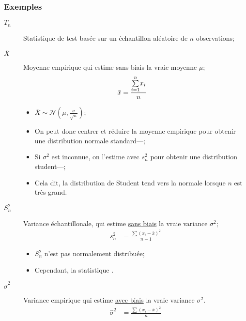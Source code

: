 \documentclass[10pt, french]{article}
\begin{document}
\begin{multicols*}{2}
\subsubsection*{Exemples}
\begin{distributions}[Notation]
\begin{description}
	\item[$T_{n}$]	Statistique de test basée sur un échantillon aléatoire de $n$ observations;
	\item[$\bar{X}$]	Moyenne empirique qui estime sans biais la vraie moyenne $\mu$;
		\begin{align*}
		\bar{x}
		&=	\frac{\overset{n}{\underset{i = 1}{\sum}} x_{i}}{n}
		\end{align*}
		\begin{itemize}
		\item	$\bar{X}	\sim \mathcal{N}(\mu, \frac{\sigma}{\sqrt{n}})$;
		\item	On peut donc centrer et réduire la moyenne empirique pour obtenir une distribution normale standard---;
		\item	Si $\sigma^{2}$ est inconnue, on l'estime avec $s^{2}_{n}$ pour obtenir une distribution student---;
		\item	Cela dit, la distribution de Student tend vers la normale lorsque $n$ est très grand.
		\end{itemize}
	\item[$S_{n}^{2}$]	Variance échantillonale, qui estime \underline{sans biais} la vraie variance $\sigma^{2}$;
		\begin{align*}
			s^{2}_{n}
			&=	\frac{\sum (x_{i} - \bar{x})^{2}}{n - 1}
		\end{align*}
		\begin{itemize}
		\item	$S^{2}_{n}$ n'est pas normalement distribuée; 
		\item	Cependant, la statistique .
		\end{itemize}
	\item[$\hat{\sigma}^{2}$]	Variance empirique qui estime \underline{avec biais} la vraie variance $\sigma^{2}$.
		\begin{align*}
		\hat{\sigma}^{2} 
		&=	\frac{\sum (x_{i} - \bar{x})^{2}}{n}
		\end{align*}
\end{description}
\end{distributions}
%


\end{multicols*}
\end{document}

